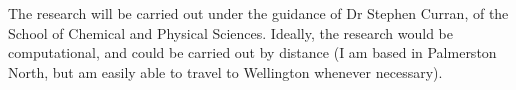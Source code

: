 \documentclass[]{letter}
\begin{document}
\begin{letter}

The research will be carried out under the guidance of Dr Stephen Curran, of the School of Chemical and Physical Sciences. Ideally, the research would be computational, and could be carried out by distance (I am based in Palmerston North, but am easily able to travel to Wellington whenever necessary).	

\end{letter}
\end{document}
